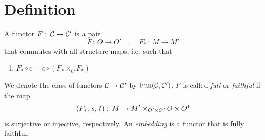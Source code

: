     \section{Definition}
        A functor $F \,\colon\, \mathcal{C} \to \mathcal{C}'$ is a pair
        \begin{equation*}
            F \,\colon\, O \to O' \quad , \quad F_* \,\colon\, M \to M'
        \end{equation*}
        that commutes with all structure maps, i.e. such that
        \begin{enumerate}[label=\arabic*)]\centering
            \item $F_* \circ c = c \circ (F_* \times_O F_*)$
        \end{enumerate}
        We denote the class of functors $\mathcal{C} \to \mathcal{C}'$ by $\operatorname{Fun}(\mathcal{C}, \mathcal{C}')$.
        $F$ is called \emph{full} or \emph{faithful} if the map
        \begin{equation*}
            (F_*, \, s, \, t) \,\colon\, M \to M' \times_{O' \times O'} O \times O \footnotemark
        \end{equation*}
        is surjective or injective, respectively. An \emph{embedding} is a functor that is fully faithful.
